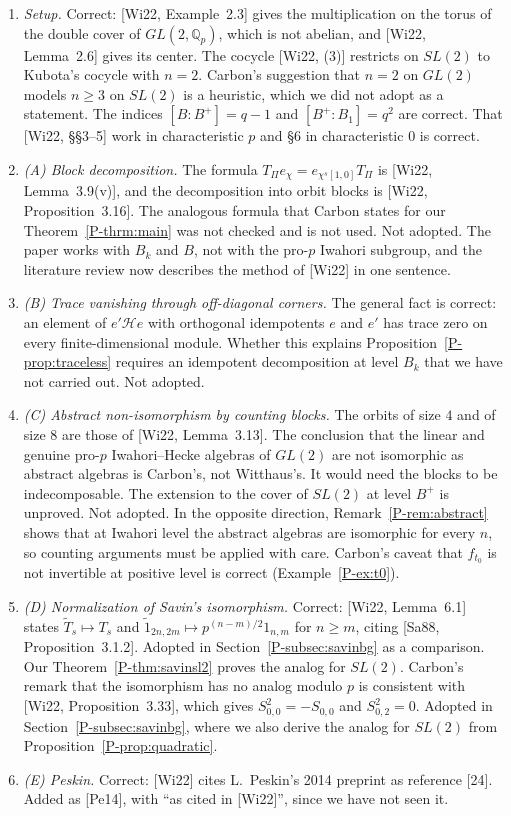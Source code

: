 \documentclass[12pt,letterpaper]{amsart}
\newcommand{\cH}{\mathcal{H}}
\begin{document}
\begin{enumerate}[leftmargin=1.5em]
\item \emph{Setup.} Correct: [Wi22, Example~2.3] gives the
multiplication on the torus of the double cover of $GL(2,\mathbb{Q}_p)$,
which is not abelian, and [Wi22, Lemma~2.6] gives its center. The
cocycle [Wi22, (3)] restricts on $SL(2)$ to Kubota's cocycle with
$n=2$. Carbon's suggestion that $n=2$ on $GL(2)$ models $n\geq 3$ on
$SL(2)$ is a heuristic, which we did not adopt as a statement. The
indices $[B:B^+]=q-1$ and $[B^+:B_1]=q^2$ are correct. That [Wi22,
\S\S3--5] work in characteristic $p$ and \S6 in characteristic $0$ is
correct.
\item \emph{(A) Block decomposition.} The formula
$T_\Pi e_\chi=e_{\chi^s[1,0]}T_\Pi$ is [Wi22, Lemma~3.9(v)], and the
decomposition into orbit blocks is [Wi22, Proposition~3.16]. The
analogous formula that Carbon states for our Theorem~\ref{P-thrm:main}
was not checked and is not used. Not adopted. The paper works with
$B_k$ and $B$, not with the pro-$p$ Iwahori subgroup, and the
literature review now describes the method of [Wi22] in one sentence.
\item \emph{(B) Trace vanishing through off-diagonal corners.} The
general fact is correct: an element of $e'\cH e$ with orthogonal
idempotents $e$ and $e'$ has trace zero on every finite-dimensional
module. Whether this explains Proposition~\ref{P-prop:traceless}
requires an idempotent decomposition at level $B_k$ that we have not
carried out. Not adopted.
\item \emph{(C) Abstract non-isomorphism by counting blocks.} The
orbits of size $4$ and of size $8$ are those of [Wi22, Lemma~3.13]. The conclusion that the
linear and genuine pro-$p$ Iwahori--Hecke algebras of $GL(2)$ are not
isomorphic as abstract algebras is Carbon's, not Witthaus's. It would
need the blocks to be indecomposable. The extension to the cover of
$SL(2)$ at level $B^+$ is unproved. Not adopted. In the opposite
direction, Remark~\ref{P-rem:abstract} shows that at Iwahori level the
abstract algebras are isomorphic for every $n$, so counting arguments
must be applied with care. Carbon's caveat that $f_{t_0}$ is not
invertible at positive level is correct (Example~\ref{P-ex:t0}).
\item \emph{(D) Normalization of Savin's isomorphism.} Correct: [Wi22,
Lemma~6.1] states $\widetilde T_s\mapsto T_s$ and $\widetilde
1_{2n,2m}\mapsto p^{(n-m)/2}1_{n,m}$ for $n\geq m$, citing [Sa88,
Proposition~3.1.2]. Adopted in Section~\ref{P-subsec:savinbg} as a
comparison. Our Theorem~\ref{P-thm:savinsl2} proves the analog for
$SL(2)$. Carbon's remark that the isomorphism has no analog modulo $p$
is consistent with [Wi22, Proposition~3.33], which gives
$S_{0,0}^2=-S_{0,0}$ and $S_{0,2}^2=0$. Adopted in
Section~\ref{P-subsec:savinbg}, where we also derive the analog for
$SL(2)$ from Proposition~\ref{P-prop:quadratic}.
\item \emph{(E) Peskin.} Correct: [Wi22] cites L.~Peskin's 2014
preprint as reference [24]. Added as [Pe14], with ``as cited in
[Wi22]'', since we have not seen it.
\end{enumerate}
\end{document}
